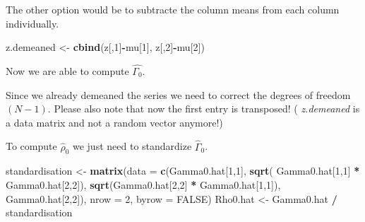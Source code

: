 \documentclass[12pt,a4paper]{article}
\newenvironment{Shaded}{\begin{snugshade}}{\end{snugshade}}
\newcommand{\DataTypeTok}[1]{\textcolor[rgb]{0.13,0.29,0.53}{#1}}
\newcommand{\DecValTok}[1]{\textcolor[rgb]{0.00,0.00,0.81}{#1}}
\newcommand{\KeywordTok}[1]{\textcolor[rgb]{0.13,0.29,0.53}{\textbf{#1}}}
\newcommand{\NormalTok}[1]{#1}
\newcommand{\OperatorTok}[1]{\textcolor[rgb]{0.81,0.36,0.00}{\textbf{#1}}}
\newcommand{\OtherTok}[1]{\textcolor[rgb]{0.56,0.35,0.01}{#1}}
\newcommand{\StringTok}[1]{\textcolor[rgb]{0.31,0.60,0.02}{#1}}
\begin{document}
The other option would be to subtracte the column means from each column
individually.

\begin{Shaded}
\begin{Highlighting}[]
\NormalTok{z.demeaned <-}\StringTok{ }\KeywordTok{cbind}\NormalTok{(z[,}\DecValTok{1}\NormalTok{]}\OperatorTok{-}\NormalTok{mu[}\DecValTok{1}\NormalTok{], z[,}\DecValTok{2}\NormalTok{]}\OperatorTok{-}\NormalTok{mu[}\DecValTok{2}\NormalTok{])}
\end{Highlighting}
\end{Shaded}

Now we are able to compute \(\widehat{\Gamma_0}\).

\begin{Shaded}
\end{Shaded}

Since we already demeaned the series we need to correct the degrees of
freedom \((N - 1)\). Please also note that now the first entry is
transposed! ( \emph{z.demeaned} is a data matrix and not a random vector
anymore!)

To compute \(\widehat{\rho}_0\) we just need to standardize
\(\widehat{\Gamma}_0\).

\begin{Shaded}
\begin{Highlighting}[]
\NormalTok{standardisation <-}\StringTok{ }\KeywordTok{matrix}\NormalTok{(}\DataTypeTok{data =} \KeywordTok{c}\NormalTok{(Gamma0.hat[}\DecValTok{1}\NormalTok{,}\DecValTok{1}\NormalTok{], }
                                   \KeywordTok{sqrt}\NormalTok{( Gamma0.hat[}\DecValTok{1}\NormalTok{,}\DecValTok{1}\NormalTok{] }\OperatorTok{*}\StringTok{ }\NormalTok{Gamma0.hat[}\DecValTok{2}\NormalTok{,}\DecValTok{2}\NormalTok{]),}
                                   \KeywordTok{sqrt}\NormalTok{(Gamma0.hat[}\DecValTok{2}\NormalTok{,}\DecValTok{2}\NormalTok{] }\OperatorTok{*}\StringTok{ }\NormalTok{Gamma0.hat[}\DecValTok{1}\NormalTok{,}\DecValTok{1}\NormalTok{]),}
\NormalTok{                                   Gamma0.hat[}\DecValTok{2}\NormalTok{,}\DecValTok{2}\NormalTok{]),}
                       \DataTypeTok{nrow =} \DecValTok{2}\NormalTok{, }\DataTypeTok{byrow =} \OtherTok{FALSE}\NormalTok{) }
\NormalTok{Rho0.hat <-}\StringTok{ }\NormalTok{Gamma0.hat }\OperatorTok{/}\StringTok{ }\NormalTok{standardisation}
\end{Highlighting}
\end{Shaded}
\end{document}
